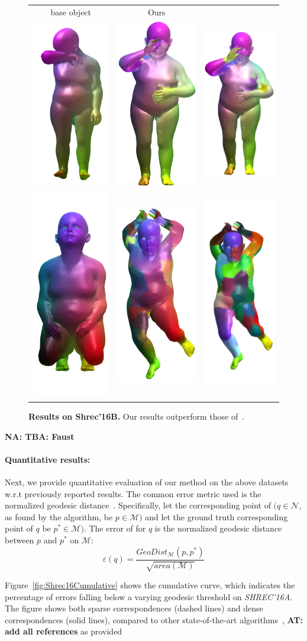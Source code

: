\documentclass[10pt,twocolumn,letterpaper]{article}
\newcommand{\colornote}[3]{{\color{#1}\bf{#2: #3}\normalfont}}
\newcommand{\colornote}[3]{}
\newcommand {\ayellet}[1]{\colornote{blue}{AT}{#1}}
\newcommand {\nadav}[1]{\colornote{red}{NA}{#1}}
\begin{document}
\begin{figure}[htb]

	\centering
	\begin{tabular}{ccc}
	    base object & Ours & \cite{rodola2017partial}  
	    \\
	    	\includegraphics[scale=0.5]{figures/Top1Base.png} & \includegraphics[scale=0.5]{figures/Top1DDIS.png} & \includegraphics[scale=0.5]{figures/Top1PFM.png} \\ \includegraphics[scale=0.5]{figures/Top2Base.png} & \includegraphics[scale=0.5]{figures/Top2DDIS.png} & \includegraphics[scale=0.5]{figures/Top2PFM.png}
	\end{tabular}

	\caption{{\bf Results on Shrec'16B.} 
	Our results outperform those of~\cite{rodola2017partial}.}
	\label{fig:Shrec16TopImage}
\end{figure}

\nadav{TBA: Faust}

\paragraph{Quantitative results:}
Next, we provide quantitative evaluation of our method on the above datasets w.r.t previously reported results.
The common error metric used is the normalized geodesic distance~\cite{kim2011blended}.
Specifically, let the corresponding point of $(q \in \mathcal{N}$, as found by the algorithm, be $ p \in \mathcal{M})$ and let the ground truth corresponding point of $q$ be $p^* \in \mathcal{M})$. 
The error of for $q$ is the normalized geodesic distance between  $p$ and $p^*$ on $\mathcal{M}$:
\begin{equation}
\varepsilon(q)=\frac{GeoDist_{\mathcal{M}}(p,p^*)}{\sqrt{area(\mathcal{M})}}
\end{equation}

Figure~\ref{fig:Shrec16Cumulative} shows the cumulative curve, which indicates the percentage of errors falling below a varying geodesic threshold on {\em SHREC'16A}. 
The figure shows both sparse correspondences (dashed lines) and dense correspondences (solid lines), compared to other state-of-the-art algorithms~\cite{litany2017fully,rodola2017partial},
\ayellet{add all references}
as provided 
\end{document}
